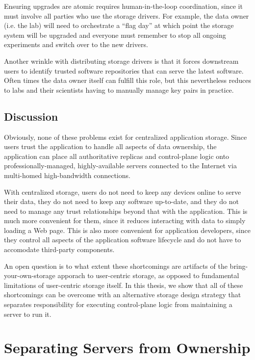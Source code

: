 Ensuring upgrades are atomic requires human-in-the-loop coordination,
since it must involve all parties who
use the storage drivers.  For example, the data owner (i.e. the lab)
will need to orchestrate a ``flag day'' at which point the storage system will
be upgraded and everyone must remember to stop all ongoing experiments and
switch over to the new drivers.

Another wrinkle with distributing storage drivers is that it
forces downstream users to identify trusted software
repositories that can serve the latest software.  Often times the data owner
itself can fulfill this role, but this nevertheless reduces to labs and their
scientists having to manually manage key pairs in practice.

\subsection{Discussion}

Obviously, none of these problems exist for centralized
application storage.  Since users trust the application to handle all aspects
of data ownership, the application can place all authoritative replicas
and control-plane logic onto professionally-managed, highly-available
servers connected to the Internet via multi-homed high-bandwidth connections.

With centralized storage, users do not need to keep any devices online to serve their data, they
do not need to keep any software up-to-date, and they do not need to manage any trust
relationships beyond that with the application.  This is much more convenient
for them, since it reduces interacting with data to simply loading a Web page.
This is also more convenient for application developers, since they control all
aspects of the application software lifecycle and do not have to accomodate
third-party components.

An open question is to what extent these shortcomings are artifacts of the
bring-your-own-storage apporach to user-centric storage, as opposed to
fundamental limitations of user-centric storage itself.  In this thesis, we
show that all of these shortcomings can be overcome with an alternative
storage design strategy that separates responsibility for executing
control-plane logic from maintaining a server to run it.

\section{Separating Servers from Ownership}

